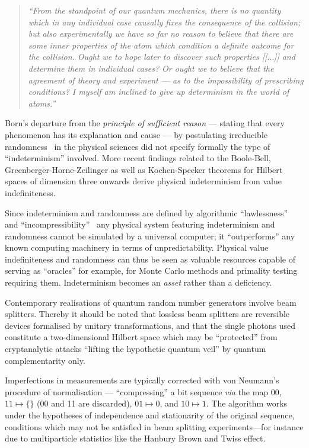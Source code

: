 \documentclass[11pt, pra,amsfonts,showpacs,showkeys]{revtex4}%
\begin{document}
\begin{quote}
{\em  ``From the standpoint of our quantum mechanics, there is no quantity
which in any individual case causally fixes the consequence of the collision;
but also experimentally we have so far no reason to believe that there are some inner properties of the atom
which condition a definite outcome for the collision.
Ought we to hope later to discover such properties [[$\ldots$]]  and determine them in individual cases?
Or ought we to  believe that the agreement of theory and experiment --- as to the impossibility
of prescribing conditions? I myself am inclined  to give up determinism in the world of atoms.''
}
\end{quote}

Born's departure from  the {\em principle of sufficient reason}
--- stating that every phenomenon has its explanation and cause ---
by postulating irreducible randomness~\cite{zeil-05_nature_ofQuantum} in the physical sciences did not specify formally the
type of ``indeterminism'' involved.
More recent findings related to the Boole-Bell, Greenberger-Horne-Zeilinger
as well as Kochen-Specker theorems for Hilbert spaces of dimension three onwards derive physical indeterminism
from value indefiniteness.




Since indeterminism and randomness are defined by algorithmic ``lawlessness'' and ``incompressibility''~\cite{chaitin:01}
any physical system featuring indeterminism and randomness cannot be simulated by a universal computer;
it ``outperforms'' any known computing machinery in terms of unpredictability.
Physical value indefiniteness and randomness  can thus be seen as valuable resources capable of serving as ``oracles''
for example, for Monte Carlo methods and primality testing requiring them.
Indeterminism becomes  an {\em asset} rather than a deficiency.

Contemporary realisations of quantum random number generators
involve beam splitters.
Thereby it should be noted that lossless beam splitters are reversible devices formalised by unitary transformations,
and that the single photons used constitute a two-dimensional Hilbert space which may be ``protected''
from cryptanalytic attacks ``lifting the hypothetic quantum veil'' by quantum complementarity only.

Imperfections in measurements are typically corrected with von Neumann's procedure of normalisation --- ``compressing'' a bit sequence {\it via} the map
$00$,$11 \mapsto \{\}$ (00 and 11 are discarded),
$01 \mapsto 0$, and
$10 \mapsto 1$. The algorithm works under the hypotheses of
 independence and stationarity of the original sequence,
conditions which may not be satisfied in beam splitting experiments---for instance due to multiparticle statistics like the Hanbury Brown and Twiss effect.
\end{document}
